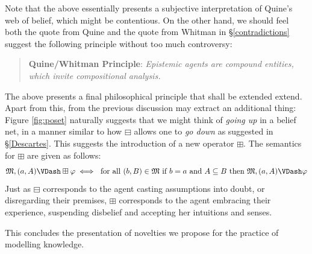 \documentclass[11pt]{article}
\numberwithin{equation}{subsection}
\renewcommand{\Omega}{\mathfrak{M}}
\newcommand{\BM}{\boxminus}
\newcommand{\BP}{\boxplus}
\renewcommand{\phi}{\varphi}
\begin{document}
Note that the above essentially presents a subjective interpretation
of Quine's web of belief, which might be contentious.  On the other
hand, we should feel both the quote from Quine and the quote from 
Whitman in \S\ref{contradictions} suggest the following principle 
without too much controversy:
\begin{quote}
 \textbf{Quine/Whitman Principle}: \emph{Epistemic agents are compound
   entities, which invite compositional analysis.}
\end{quote}
The above presents a final philosophical principle that shall be extended
extend.  Apart from this, from the previous discussion may extract an additional thing:  Figure \ref{fig:poset}
naturally suggests that we might think of \emph{going up} in a belief
net, in a manner similar to how $\BM$ allows one to \emph{go down} as
 suggested in \S\ref{Descartes}. This suggests
the introduction of a new operator $\BP$.  The semantics for $\BP$ are
given as follows:
\[ \Omega,(a,A) \VDash \BP \phi \iff \textup{ for all }
(b,B)\in\Omega\textup{ if } b = a \textup{ and } A\subseteq B \textup{
  then } \Omega,(a,A) \VDash \phi \]
Just as $\BM$ corresponds to the agent casting assumptions into doubt,
or disregarding their premises, $\BP$ corresponds to the agent
embracing their experience, suspending disbelief and accepting her
intuitions and senses.

This concludes the presentation of novelties we propose for the
practice of modelling knowledge.
\end{document}
